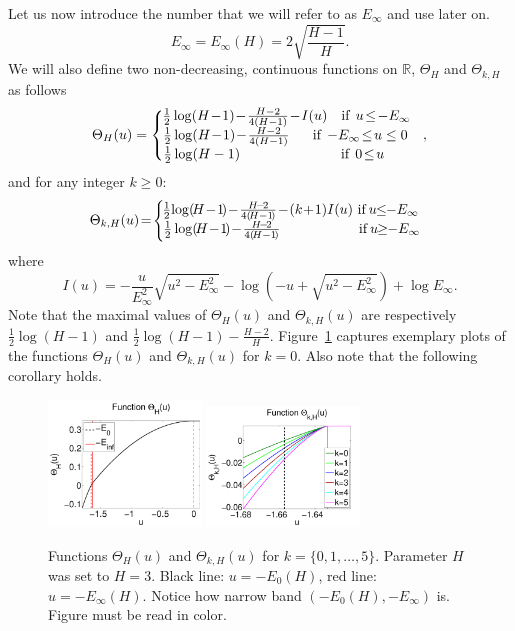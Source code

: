 \documentclass[twoside]{article}
\begin{document}
Let us now introduce the number that we will refer to as $E_{\infty}$ and use later on.
\begin{equation}
E_{\infty} = E_{\infty}(H) = 2\sqrt{\frac{H-1}{H}}.
\label{eq:E_inf}
\end{equation}
We will also define two non-decreasing, continuous functions on $\mathbb{R}$, $\Theta_H$ and $\Theta_{k,H}$ as follows
\[\Theta_H(u) = \left \{
  \begin{tabular}{c}
  $\!\!\!\!\frac{1}{2}\log(H\!-\!1) \!-\! \frac{H-2}{4(H-1)} \!-\! I(u)$ $\:\:\:$if$\:\:$$u \!\leq\! -E_{\infty}$\\
  $\!\!\!\!\!\frac{1}{2}\log(H\!-\!1) \!-\! \frac{H-2}{4(H-1)}$ $\:\:\:\:\:\:$if$\:\:$$-E_{\infty} \!\leq\! u \leq 0$\\
  $\!\!\!\!\!\!\!\!\!\!\!\!\!\!\!\frac{1}{2}\log(H-1)$ $\:\:\:\:\:\:\:\:\:\:\:\:\:\:\:\:\:\:\:\:\:\:\:\:\:\:\:\:\:\:\:$if$\:\:$$0 \!\leq\! u$
  \end{tabular}
\right.,
\]
and for any integer $k \geq 0$:
\[\Theta_{k,H}(u) \!=\! \left \{
  \begin{tabular}{c}
  $\!\!\!\!\!\frac{1}{2}\!\log(\!H\!-\!1\!) \!-\! \frac{H\!-\!2}{4(\!H-1\!)} \!-\! (k\!+\!1)I(u)$ if$\:$$u \!\!\leq\!\! -E_{\infty}$\\
  $\!\!\!\!\frac{1}{2}\log(\!H\!-\!1\!) \!-\! \frac{H\!-\!2}{4(\!H-1\!)}$ $\:\:\:\:\:\:\:\:\:\:\:\:\:\:\:\:\:\:\:\:\:\:\:\:$if$\:$$u \!\!\geq\!\! -E_{\infty}$
  \end{tabular}
\right.
\]
where 
\[I(u) = -\frac{u}{E_{\infty}^2}\sqrt{u^2 - E_{\infty}^2} - \log(-u + \sqrt{u^2 - E_{\infty}^2}) + \log E_{\infty}.
\]
Note that the maximal values of $\Theta_H(u)$ and $\Theta_{k,H}(u)$ are respectively $\frac{1}{2}\log(H-1)$ and $\frac{1}{2}\log(H-1) - \frac{H-2}{H}$. Figure~\ref{fig:Thetas} captures exemplary plots of the functions $\Theta_H(u)$ and $\Theta_{k,H}(u)$ for $k = 0$. Also note that the following corollary holds.

\begin{figure}[h]
  \center
\includegraphics[width = 1.6in]{Theta_cp.pdf}
\includegraphics[width = 1.6in]{Theta_lm_sp.pdf}
\vspace{-0.3in}
\caption{Functions $\Theta_H(u)$ and $\Theta_{k,H}(u)$ for $k = \{0,1,\dots,5\}$. Parameter $H$ was set to $H = 3$. Black line: $u = -E_0(H)$, red line: $u = -E_{\infty}(H)$. Notice how narrow band $(-E_0(H),-E_{\infty})$ is. Figure must be read in color.}
\label{fig:Thetas}
\end{figure}
\end{document}

